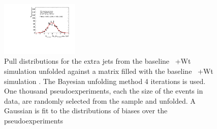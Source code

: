 \begin{figure}
\includegraphics[width=0.33\textwidth]{fig/UnfoldPull/SingleSlicePull40.pdf}
%
\caption{Pull distributions for the extra jets from the baseline \ttbar\ +Wt simulation  unfolded against a matrix filled with the baseline \ttbar\ +Wt simulation . The Bayesian unfolding method 4 iterations is used. One thousand pseudoexperiments, each the size of the events in data, are randomly selected from the sample and unfolded.  A Gaussian is fit to the distributions of biases over the pseudoexperiments}
\label{fig:appPull2}
\end{figure}
\clearpage
